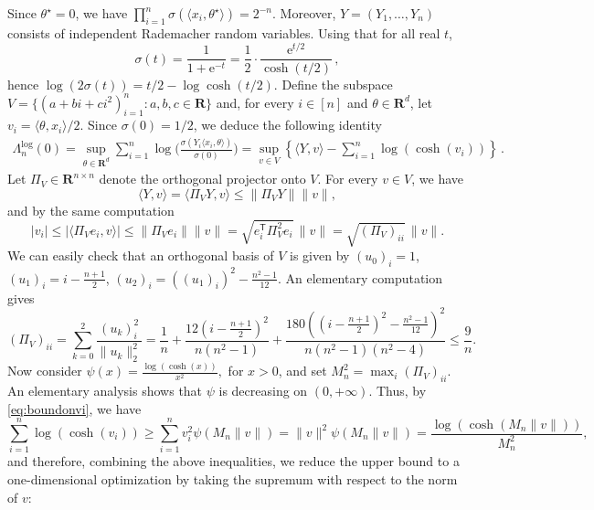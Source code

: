 \documentclass[10pt,a4paper]{amsart}
\makeatletter
\newcommand{\R}{\mathbf R}
\newcommand{\T}{\mathsf{T}}
\newcommand{\e}{\mathrm{e}}
\renewcommand{\ge}{\geqslant}
\renewcommand{\leq}{\leqslant}
\renewenvironment{proof}[1][\proofname]{\par\pushQED{\qed}\normalfont \topsep6\p@\@plus6\p@\relax\trivlist\item[\hskip\labelsep#1\@addpunct{}]\ignorespaces}{\popQED\endtrivlist\@endpefalse}
\newcommand{\thetastar}{\theta^\star}
\makeatother
\begin{document}
\begin{proof}
Since $\thetastar = 0$, we have
$
\prod_{i = 1}^n \sigma(\langle x_i, \thetastar\rangle) = 2^{-n}.$
Moreover, $Y = (Y_1, \ldots, Y_n)$ consists of independent Rademacher random variables. Using that for all real $t$,
\begin{equation}
	\sigma(t) = \frac{1}{1+\e^{-t}} = \frac 1 2 \cdot \frac{\e^{t/2}}{\cosh(t/2)} \, ,
\end{equation}
hence $\log(2\sigma(t)) = t/2 - \log\cosh(t/2)$. Define the subspace $V = \{(a + bi + ci^2)_{i = 1}^n : a, b, c \in \R\}$ and, for every $i \in [n]$ and $\theta \in \R^{d}$, let $v_i = \langle \theta, x_i \rangle/2$. Since $\sigma(0)=1/2$, we deduce the following identity
\begin{align}
\Lambda_n^{\log}(0)
	= \sup_{\theta \in \R^{d}} \sum_{i=1}^n
		\log\Big(\frac{\sigma(Y_i\langle x_i,\theta\rangle)}{\sigma(0)} \Big)
	= \sup\limits_{v \in V}\left\{\langle Y, v\rangle - \sum\limits_{i = 1}^n \log(\cosh(v_i))\right\} \, .
\end{align}
 Let $\Pi_{V} \in \R^{n \times n}$ denote the orthogonal projector onto $V$. For every $v \in V$, we have
\[
\langle Y, v\rangle = \langle \Pi_{V} Y, v\rangle \leq \|\Pi_{V} Y\| \|v\|,
\]
and by the same computation
\begin{equation}
\label{eq:boundonvi}
|v_i| \leq |\langle \Pi_{V} e_i, v\rangle| \leq \|\Pi_{V} e_i\| \|v\| = \sqrt{e_i^{\T}\Pi_{V}^2 e_i}\,\|v\| = \sqrt{(\Pi_{V})_{ii}}\,\|v\|.
\end{equation}
We can easily check that an orthogonal basis of $V$ is given by $(u_0)_i = 1$, $(u_1)_i = i - \frac{n+1}{2}$, $(u_2)_i = ((u_1)_i)^2 - \frac{n^2 - 1}{12}$. An elementary computation gives
\begin{equation}
\label{eq:projdiagonal}
(\Pi_{V})_{ii}
= \sum_{k = 0}^2 \frac{(u_k)_i^2}{\|u_k\|_2^2}
=
\frac1n
+\frac{12\left(i-\frac{n+1}{2}\right)^2}{n(n^2-1)}
+\frac{180\left(\left(i-\frac{n+1}{2}\right)^2-\frac{n^2-1}{12}\right)^2}{n(n^2-1)(n^2-4)}
\leq \frac9n.
\end{equation}
Now consider
$
\psi(x) = \frac{\log(\cosh(x))}{x^2},
$
for $x > 0$,
and set $M_n^2 = \max_i (\Pi_{V})_{ii}$. An elementary analysis shows that $\psi$ is decreasing on $(0,+\infty)$. Thus, by \eqref{eq:boundonvi}, we have
\[
\sum\limits_{i = 1}^n \log(\cosh(v_i))
\ge
\sum\limits_{i = 1}^n v_i^2 \psi\left(M_n \|v\|\right)
=
\|v\|^2 \psi\left(M_n \|v\|\right)
=
\frac{\log(\cosh(M_n \|v\|))}{M_n^2},
\]
and therefore, combining the above inequalities, we reduce the upper bound to a one-dimensional optimization by taking the supremum with respect to the norm of $v$:

\end{proof}
\end{document}
